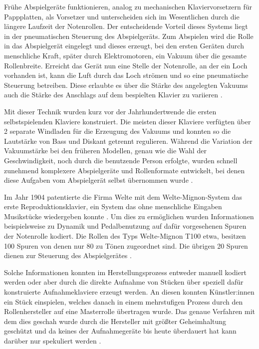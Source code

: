 Frühe Abspielgeräte funktionieren, analog zu mechanischen Klaviervorsetzern für Pappplatten, als Vorsetzer und unterscheiden sich im Wesentlichen durch die längere Laufzeit der Notenrollen.
Der entscheidende Vorteil dieses Systems liegt in der pneumatischen Steuerung des Abspielgeräts.
Zum Abspielen wird die Rolle in das Abspielgerät eingelegt und dieses erzeugt, bei den ersten Geräten durch menschliche Kraft, später durch Elektromotoren, ein Vakuum über die gesamte Rollenbreite.
Erreicht das Gerät nun eine Stelle der Notenrolle, an der ein Loch vorhanden ist, kann die Luft durch das Loch strömen und so eine pneumatische Steuerung betreiben.
Diese erlaubte es über die Stärke des angelegten Vakuums auch die Stärke des Anschlags auf dem bespielten Klavier zu variieren \parencite[III.5.d. Selbstspielende Klaviere]{mgg_mechanische}.

Mit dieser Technik wurden kurz vor der Jahrhundertwende die ersten selbstspielenden Klaviere konstruiert.
Die meisten dieser Klaviere verfügten über 2 separate Windladen für die Erzeugung des Vakuums und konnten so die Lautstärke von Bass und Diskant getrennt regulieren.
Während die Variation der Vakuumstärke bei den früheren Modellen, genau wie die Wahl der Geschwindigkeit, noch durch die benutzende Person erfolgte, wurden schnell zunehmend komplexere Abspielgeräte und Rollenformate entwickelt, bei denen diese Aufgaben vom Abspielgerät selbst übernommen wurde \parencite[III.5.d. Selbstspielende Klaviere]{mgg_mechanische}.

Im Jahr 1904 patentierte die Firma Welte mit dem Welte-Mignon-System das erste Reproduktionsklavier, ein System das ohne menschliche Eingaben Musikstücke wiedergeben konnte \parencite[III.5.d. Selbstspielende Klaviere]{mgg_mechanische}.
Um dies zu ermöglichen wurden Informationen beispielsweise zu Dynamik und Pedalbenutzung auf dafür vorgesehenen Spuren der Notenrolle kodiert.
Die Rollen des Typs Welte-Mignon T100 etwa, besitzen 100 Spuren von denen nur 80 zu Tönen zugeordnet sind.
Die übrigen 20 Spuren dienen zur Steuerung des Abspielgerätes \parencite[]{mxp_2002522}.

Solche Informationen konnten im Herstellungsprozess entweder manuell kodiert werden oder aber durch die direkte Aufnahme von Stücken über speziell dafür konstruierte Aufnahmeklaviere erzeugt werden.
An diesen konnten Künstler:innen ein Stück einspielen, welches danach in einem mehrstufigen Prozess durch den Rollenhersteller auf eine Masterrolle übertragen wurde.
Das genaue Verfahren mit dem dies geschah wurde durch die Hersteller mit größter Geheimhaltung geschützt und da keines der Aufnahmegeräte bis heute überdauert hat kann darüber nur spekuliert werden \parencite[]{zoltan_1994}.

